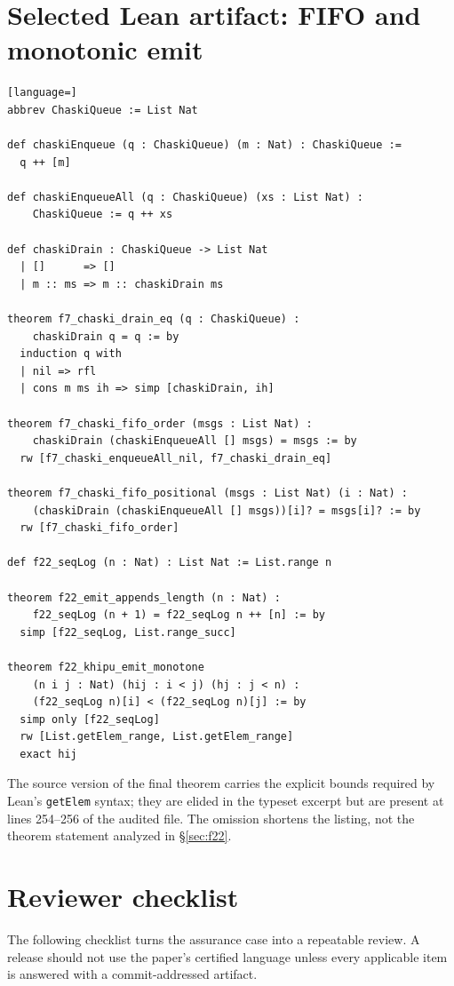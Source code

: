 \documentclass[11pt,letterpaper]{article}
\theoremstyle{definition}
\begin{document}
\section{Selected Lean artifact: FIFO and monotonic emit}
\label{app:f7f22}

\begin{lstlisting}[language=]
abbrev ChaskiQueue := List Nat

def chaskiEnqueue (q : ChaskiQueue) (m : Nat) : ChaskiQueue :=
  q ++ [m]

def chaskiEnqueueAll (q : ChaskiQueue) (xs : List Nat) :
    ChaskiQueue := q ++ xs

def chaskiDrain : ChaskiQueue -> List Nat
  | []      => []
  | m :: ms => m :: chaskiDrain ms

theorem f7_chaski_drain_eq (q : ChaskiQueue) :
    chaskiDrain q = q := by
  induction q with
  | nil => rfl
  | cons m ms ih => simp [chaskiDrain, ih]

theorem f7_chaski_fifo_order (msgs : List Nat) :
    chaskiDrain (chaskiEnqueueAll [] msgs) = msgs := by
  rw [f7_chaski_enqueueAll_nil, f7_chaski_drain_eq]

theorem f7_chaski_fifo_positional (msgs : List Nat) (i : Nat) :
    (chaskiDrain (chaskiEnqueueAll [] msgs))[i]? = msgs[i]? := by
  rw [f7_chaski_fifo_order]

def f22_seqLog (n : Nat) : List Nat := List.range n

theorem f22_emit_appends_length (n : Nat) :
    f22_seqLog (n + 1) = f22_seqLog n ++ [n] := by
  simp [f22_seqLog, List.range_succ]

theorem f22_khipu_emit_monotone
    (n i j : Nat) (hij : i < j) (hj : j < n) :
    (f22_seqLog n)[i] < (f22_seqLog n)[j] := by
  simp only [f22_seqLog]
  rw [List.getElem_range, List.getElem_range]
  exact hij
\end{lstlisting}

The source version of the final theorem carries the explicit bounds required by
Lean's \texttt{getElem} syntax; they are elided in the typeset excerpt but are
present at lines 254--256 of the audited file. The omission shortens the
listing, not the theorem statement analyzed in \S\ref{sec:f22}.

\section{Reviewer checklist}
\label{app:checklist}

The following checklist turns the assurance case into a repeatable review. A
release should not use the paper's certified language unless every applicable
item is answered with a commit-addressed artifact.
\end{document}
